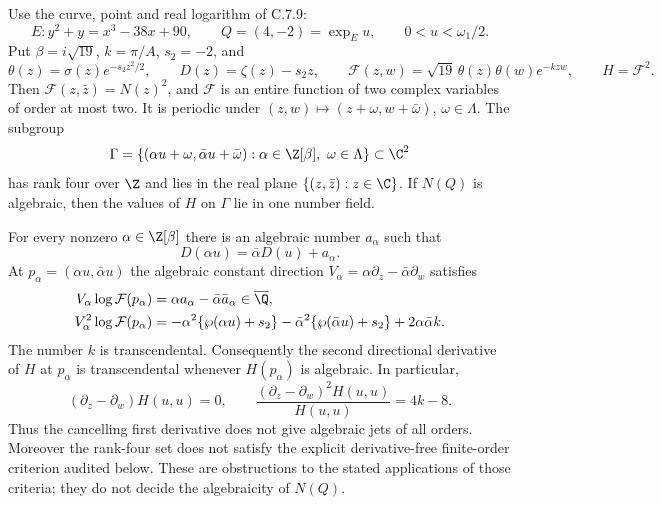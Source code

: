 \begin{statement}
Use the curve, point and real logarithm of C.7.9:
\[
 E:y^2+y=x^3-38x+90,\qquad Q=(4,-2)=\exp_Eu,
 \qquad 0<u<\omega_1/2.
\]
Put $\beta=i\sqrt{19}$, $k=\pi/A$, $s_2=-2$, and
\[
 \theta(z)=\sigma(z)e^{-s_2z^2/2},\qquad
 D(z)=\zeta(z)-s_2z,\qquad
 \mathcal F(z,w)=\sqrt{19}\,\theta(z)\theta(w)e^{-kzw},
 \qquad H=\mathcal F^2.
\]
Then $\mathcal F(z,\bar z)=N(z)^2$, and $\mathcal F$ is an
entire function of two complex variables of order at most two.
It is periodic under $(z,w)\mapsto(z+\omega,w+\bar\omega)$,
$\omega\in\Lambda$. The subgroup
\[
 \Gamma=\{(\alpha u+\omega,\bar\alpha u+\bar\omega):
                   \alpha\in\Z[\beta],\ \omega\in\Lambda\}
 \subset\C^2
\]
has rank four over $\Z$ and lies in the real plane
$\{(z,\bar z):z\in\C\}$. If $N(Q)$ is algebraic, then the
values of $H$ on $\Gamma$ lie in one number field.

For every nonzero $\alpha\in\Z[\beta]$ there is an algebraic
number $a_\alpha$ such that
\[
 D(\alpha u)=\bar\alpha D(u)+a_\alpha.
\]
At $p_\alpha=(\alpha u,\bar\alpha u)$ the algebraic constant
direction $V_\alpha=\alpha\partial_z-\bar\alpha\partial_w$
satisfies
\begin{align*}
 V_\alpha\log\mathcal F(p_\alpha)
    &=\alpha a_\alpha-\bar\alpha\bar a_\alpha
                         \in\overline{\Q},\\
 V_\alpha^2\log\mathcal F(p_\alpha)
    &=-\alpha^2\{\wp(\alpha u)+s_2\}
      -\bar\alpha^2\{\wp(\bar\alpha u)+s_2\}
      +2\alpha\bar\alpha k.
\end{align*}
The number $k$ is transcendental. Consequently the second
directional derivative of $H$ at $p_\alpha$ is transcendental
whenever $H(p_\alpha)$ is algebraic. In particular,
\[
 (\partial_z-\partial_w)H(u,u)=0,\qquad
 \frac{(\partial_z-\partial_w)^2H(u,u)}{H(u,u)}=4k-8.
\]
Thus the cancelling first derivative does not give algebraic jets
of all orders. Moreover the rank-four set does not satisfy the
explicit derivative-free finite-order criterion audited below.
These are obstructions to the stated applications of those
criteria; they do not decide the algebraicity of $N(Q)$.
\end{statement}

